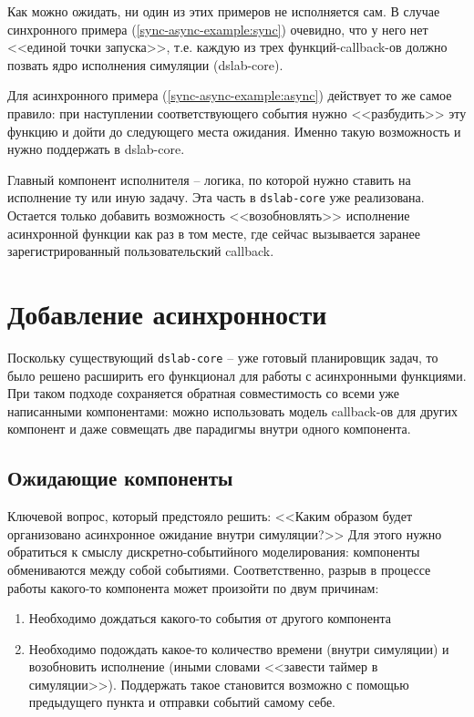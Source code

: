 Как можно ожидать, ни один из этих примеров не исполняется сам. В случае синхронного примера (\ref{sync-async-example:sync}) очевидно, что у него нет <<единой точки запуска>>, т.е. каждую из трех функций-callback-ов должно позвать ядро исполнения симуляции (dslab-core). 

Для асинхронного примера (\ref{sync-async-example:async}) действует то же самое правило: при наступлении соответствующего события нужно <<разбудить>> эту функцию и дойти до следующего места ожидания. Именно такую возможность и нужно поддержать в dslab-core. 

Главный компонент исполнителя -- логика, по которой нужно ставить на исполнение ту или иную задачу. Эта часть в \texttt{dslab-core} уже реализована. Остается только добавить возможность <<возобновлять>> исполнение асинхронной функции как раз в том месте, где сейчас вызывается заранее зарегистрированный пользовательский callback.


\section{Добавление асинхронности}

Поскольку существующий \texttt{dslab-core} -- уже готовый планировщик задач, то было решено расширить его функционал для работы с асинхронными функциями. При таком подходе сохраняется обратная совместимость со всеми уже написанными компонентами: можно использовать модель callback-ов для других компонент и даже совмещать две парадигмы внутри одного компонента. 

\subsection{Ожидающие компоненты}

Ключевой вопрос, который предстояло решить: <<Каким образом будет организовано асинхронное ожидание внутри симуляции?>> Для этого нужно обратиться к смыслу дискретно-событийного моделирования: компоненты обмениваются между собой событиями. Соответственно, разрыв в процессе работы какого-то компонента может произойти по двум причинам:
\begin{enumerate}
    \item Необходимо дождаться какого-то события от другого компонента 
    \item Необходимо подождать какое-то количество времени (внутри симуляции) и возобновить исполнение (иными словами <<завести таймер в симуляции>>). Поддержать такое становится возможно с помощью предыдущего пункта и отправки событий самому себе. 
\end{enumerate}

